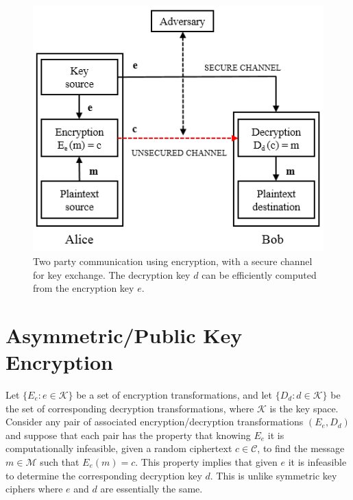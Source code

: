 	\begin{figure}[h!]
	 	\centering
	 	\includegraphics{images/symmetric-key.png}
	 	\caption{Two party communication using encryption, with a secure channel for key exchange. The decryption key $d$ can be efficiently computed from the encryption key $e$. }
	 	\label{fig:symmetric-key}
	 \end{figure} 

\section{Asymmetric/Public Key Encryption}
Let $\{E_{e}: e \in \mathcal{K}\}$ be a set of encryption transformations, and let $\{D_{d}: d \in \mathcal{K}\}$ be the set of corresponding decryption transformations, where $\mathcal{K}$ is the key space.
Consider any pair of associated encryption/decryption transformations $(E_{e},D_{d})$ and suppose that each pair has the property that knowing $E_{e}$ it is computationally infeasible, given a random ciphertext $c \in \mathcal{C}$, to find the message $m \in \mathcal{M}$ such that $E_{e}(m) = c$.
This property implies that given $e$ it is infeasible to determine the corresponding decryption key $d$.
This is unlike symmetric key ciphers where $e$ and $d$ are essentially the same\cite{menezes2010handbook}.

